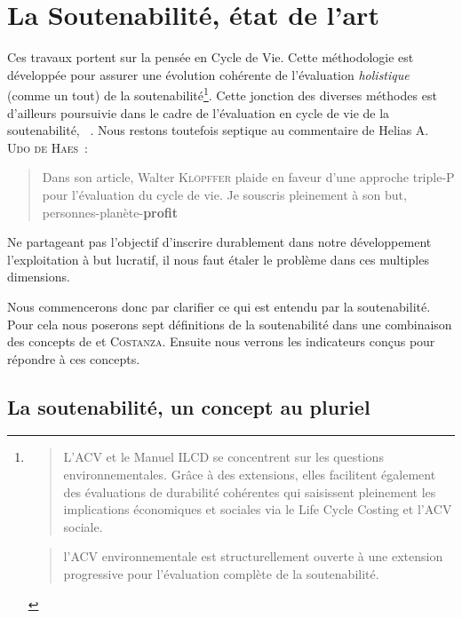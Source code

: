 \section{La Soutenabilité, état de l'art}
\label{sec:La Soutenabilité}
Ces travaux portent sur la pensée en Cycle de Vie.
Cette méthodologie est développée pour assurer une évolution cohérente de l'évaluation \textit{holistique} (comme un tout) de la soutenabilité\footnote{
\blockcquote[traduction]{jrc_jrc_2012}{
L'ACV et le Manuel ILCD se concentrent sur les questions environnementales.
Grâce à des extensions, elles facilitent également des évaluations de durabilité cohérentes qui saisissent pleinement les implications économiques et sociales via le Life Cycle Costing et l'ACV sociale.
}
\blockcquote[traduction]{jrc_jrc_2012}{
l'ACV environnementale est structurellement ouverte à une extension progressive pour l'évaluation complète de la soutenabilité.
}
}.
Cette jonction des diverses méthodes est d'ailleurs poursuivie dans le cadre de l'évaluation en cycle de vie de la soutenabilité, ~\cite{kloepffer_life_2008}.
Nous restons toutefois septique au commentaire de Helias A. \textsc{Udo de Haes}~:
\blockcquote[traduction]{kloepffer_life_2008}{
Dans son article, Walter \textsc{Klöpffer} plaide en faveur d'une approche triple-P pour l'évaluation du cycle de vie. Je souscris pleinement à son but, personnes-planète-\textbf{profit}
}
Ne partageant pas l'objectif d'inscrire durablement dans notre développement l'exploitation à but lucratif, il nous faut étaler le problème dans ces multiples dimensions.

Nous commencerons donc par clarifier ce qui est entendu par la soutenabilité.
Pour cela nous poserons sept définitions de la soutenabilité dans une combinaison des concepts de \citeauthor{perman_natural_2009} et \textsc{Costanza}.
Ensuite nous verrons les indicateurs conçus pour répondre à ces concepts. 
\subsection{La soutenabilité, un concept au pluriel}
\label{subsec:La soutenabilité, un concept au pluriel}

